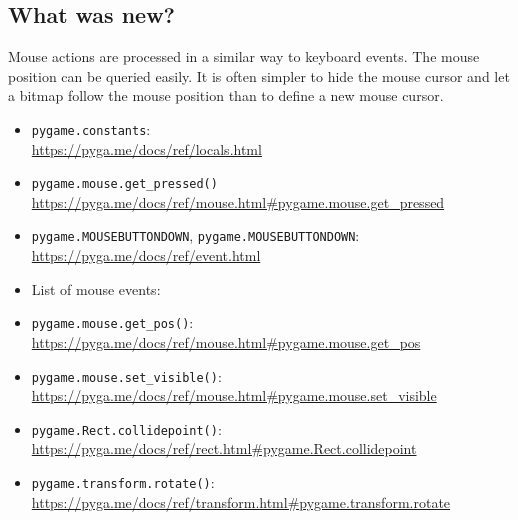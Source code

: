 \subsection{What was new?}
\begin{hintbox}
	Mouse actions are processed in a similar way to keyboard events. The mouse position can be queried easily. It is often simpler to hide the mouse cursor and let a bitmap follow the mouse position than to define a new mouse cursor.
\end{hintbox}

\begin{pygbox}
\begin{itemize}
	\item \texttt{pygame.constants}:
	\\ 
	\url{https://pyga.me/docs/ref/locals.html}
	
	\item \texttt{pygame.mouse.get\_pressed()}
	\\ \url{https://pyga.me/docs/ref/mouse.html#pygame.mouse.get_pressed}
	
	\item \texttt{pygame.MOUSEBUTTONDOWN}, \texttt{pygame.MOUSEBUTTONDOWN}:
	\\ \url{https://pyga.me/docs/ref/event.html}
	
	\item List of mouse events: 
	\item \texttt{pygame.mouse.get\_pos()}:
	\\ \url{https://pyga.me/docs/ref/mouse.html#pygame.mouse.get_pos}
	
	\item \texttt{pygame.mouse.set\_visible()}:
	\\ \url{https://pyga.me/docs/ref/mouse.html#pygame.mouse.set_visible}
	
	\item \texttt{pygame.Rect.collidepoint()}:
	\\ \url{https://pyga.me/docs/ref/rect.html#pygame.Rect.collidepoint}
	
	\item \texttt{pygame.transform.rotate()}:
	\\ \url{https://pyga.me/docs/ref/transform.html#pygame.transform.rotate}
	
\end{itemize}
\end{pygbox}

